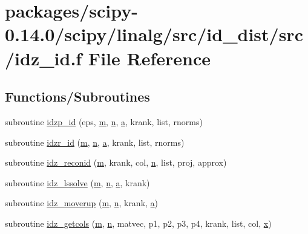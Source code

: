 \hypertarget{idz__id_8f}{}\section{packages/scipy-\/0.14.0/scipy/linalg/src/id\+\_\+dist/src/idz\+\_\+id.f File Reference}
\label{idz__id_8f}
\subsection*{Functions/\+Subroutines}
\begin{DoxyCompactItemize}
\item 
subroutine \hyperlink{idz__id_8f_a322a6a72e70558d02a7c57207a8f6909}{idzp\+\_\+id} (eps, \hyperlink{indexexpr_8h_ab72fdb4031d47b75ab26dd18a437bcdc}{m}, \hyperlink{indexexpr_8h_ab427e2e2b4d6cec55fa088ea2a692ace}{n}, \hyperlink{gen__mat5files_8m_aae328bf20413f220e38aec4d95bfd6da}{a}, krank, list, rnorms)
\item 
subroutine \hyperlink{idz__id_8f_a35413efd7b534bf6337b0b9b8825ffa4}{idzr\+\_\+id} (\hyperlink{indexexpr_8h_ab72fdb4031d47b75ab26dd18a437bcdc}{m}, \hyperlink{indexexpr_8h_ab427e2e2b4d6cec55fa088ea2a692ace}{n}, \hyperlink{gen__mat5files_8m_aae328bf20413f220e38aec4d95bfd6da}{a}, krank, list, rnorms)
\item 
subroutine \hyperlink{idz__id_8f_adb42b0019fc1cf293cdf40e6b1d5540d}{idz\+\_\+reconid} (\hyperlink{indexexpr_8h_ab72fdb4031d47b75ab26dd18a437bcdc}{m}, krank, col, \hyperlink{indexexpr_8h_ab427e2e2b4d6cec55fa088ea2a692ace}{n}, list, proj, approx)
\item 
subroutine \hyperlink{idz__id_8f_abc02c2b01c6fa5dd17e457c11a626919}{idz\+\_\+lssolve} (\hyperlink{indexexpr_8h_ab72fdb4031d47b75ab26dd18a437bcdc}{m}, \hyperlink{indexexpr_8h_ab427e2e2b4d6cec55fa088ea2a692ace}{n}, \hyperlink{gen__mat5files_8m_aae328bf20413f220e38aec4d95bfd6da}{a}, krank)
\item 
subroutine \hyperlink{idz__id_8f_a2455de5e530758e2a8bcddf869dc4e6d}{idz\+\_\+moverup} (\hyperlink{indexexpr_8h_ab72fdb4031d47b75ab26dd18a437bcdc}{m}, \hyperlink{indexexpr_8h_ab427e2e2b4d6cec55fa088ea2a692ace}{n}, krank, \hyperlink{gen__mat5files_8m_aae328bf20413f220e38aec4d95bfd6da}{a})
\item 
subroutine \hyperlink{idz__id_8f_a58884a05c96082fb29762e1f665dd42f}{idz\+\_\+getcols} (\hyperlink{indexexpr_8h_ab72fdb4031d47b75ab26dd18a437bcdc}{m}, \hyperlink{indexexpr_8h_ab427e2e2b4d6cec55fa088ea2a692ace}{n}, matvec, p1, p2, p3, p4, krank, list, col, \hyperlink{vecnorm1_8cc_ac73eed9e41ec09d58f112f06c2d6cb63}{x})

\end{DoxyCompactItemize}
